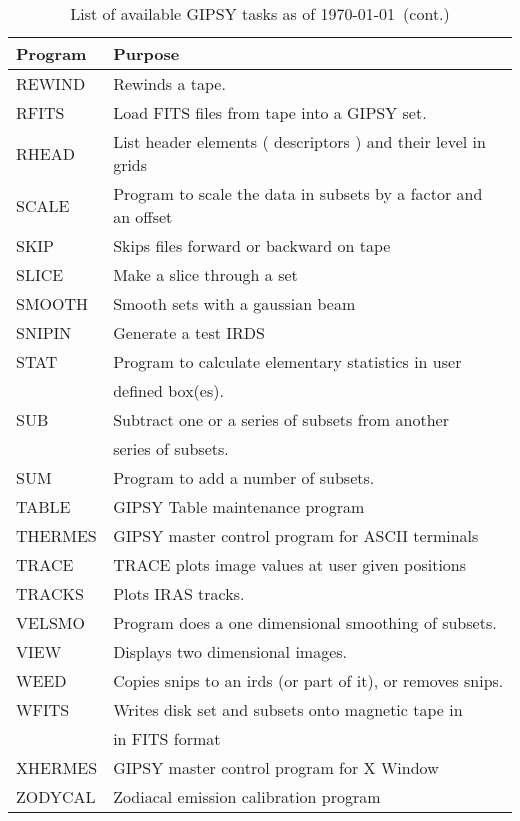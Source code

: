 \begin{table}
\begin{center}
\begin{tabular}{ | l | l | }
\hline
Program & Purpose \\
\hline
REWIND   & Rewinds a tape.\\
RFITS    & Load FITS files from tape into a GIPSY set.\\
RHEAD    & List header elements ( descriptors ) and their level in grids\\
SCALE    & Program to scale the data in subsets by a factor and an offset\\
SKIP     & Skips files forward or backward on tape\\
SLICE    & Make a slice through a set\\
SMOOTH   & Smooth sets with a gaussian beam\\
SNIPIN   & Generate a test IRDS\\
STAT     & Program to calculate elementary statistics in user \\
         & defined box(es).\\
SUB      & Subtract one or a series of subsets from another \\
         & series of subsets.\\
SUM      & Program to add a number of subsets.\\
TABLE    & GIPSY Table maintenance program\\
THERMES  & GIPSY master control program for ASCII terminals\\
TRACE    & TRACE plots image values at user given positions\\
TRACKS   & Plots IRAS tracks.\\
VELSMO   & Program does a one dimensional smoothing of subsets.\\
VIEW     & Displays two dimensional images.\\
WEED     & Copies snips to an irds (or part of it), or removes snips.\\
WFITS    & Writes disk set and subsets onto magnetic tape in\\
         & in FITS format\\
XHERMES  & GIPSY master control program for X Window\\
ZODYCAL  & Zodiacal emission calibration program\\
\hline
\end{tabular}
\caption{List of available GIPSY tasks as of \today\ (cont.)}
\end{center}
\end{table}


